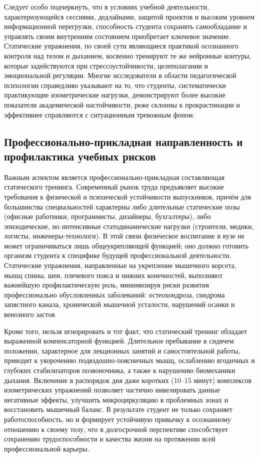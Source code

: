 \documentclass[oneside,a4paper,14pt]{extarticle}
\begin{document}
Следует особо подчеркнуть, что в условиях учебной деятельности, характеризующейся сессиями, дедлайнами, защитой проектов и высоким уровнем информационной перегрузки, способность студента сохранять самообладание и управлять своим внутренним состоянием приобретает ключевое значение. Статические упражнения, по своей сути являющиеся практикой осознанного контроля над телом и дыханием, косвенно тренируют те же нейронные контуры, которые задействуются при стрессоустойчивости, целеполагании и эмоциональной регуляции. Многие исследователи в области педагогической психологии справедливо указывают на то, что студенты, систематически практикующие изометрические нагрузки, демонстрируют более высокие показатели академической настойчивости, реже склонны к прокрастинации и эффективнее справляются с ситуационным тревожным фоном.

\subsection{Профессионально-прикладная направленность и профилактика учебных рисков}

Важным аспектом является профессионально-прикладная составляющая статического тренинга. Современный рынок труда предъявляет высокие требования к физической и психической устойчивости выпускников, причём для большинства специальностей характерны либо длительные статические позы (офисные работники, программисты, дизайнеры, бухгалтеры), либо эпизодические, но интенсивные статодинамические нагрузки (строители, медики, логисты, инженеры-технологи). В этой связи физическое воспитание в вузе не может ограничиваться лишь общеукрепляющей функцией; оно должно готовить организм студента к специфике будущей профессиональной деятельности. Статические упражнения, направленные на укрепление мышечного корсета, мышц спины, шеи, плечевого пояса и нижних конечностей, выполняют важнейшую профилактическую роль, минимизируя риски развития профессионально обусловленных заболеваний: остеохондроза, синдрома запястного канала, хронической мышечной усталости, нарушений осанки и венозного застоя.

Кроме того, нельзя игнорировать и тот факт, что статический тренинг обладает выраженной компенсаторной функцией. Длительное пребывание в сидячем положении, характерное для лекционных занятий и самостоятельной работы, приводит к укорочению подвздошно-поясничных мышц, ослаблению ягодичных и глубоких стабилизаторов позвоночника, а также к нарушению биомеханики дыхания. Включение в распорядок дня даже коротких (10--15 минут) комплексов изометрических упражнений позволяет частично нивелировать данные негативные эффекты, улучшить микроциркуляцию в проблемных зонах и восстановить мышечный баланс. В результате студент не только сохраняет работоспособность, но и формирует устойчивую привычку к осознанному отношению к своему телу, что в долгосрочной перспективе способствует сохранению трудоспособности и качества жизни на протяжении всей профессиональной карьеры.
\end{document}
